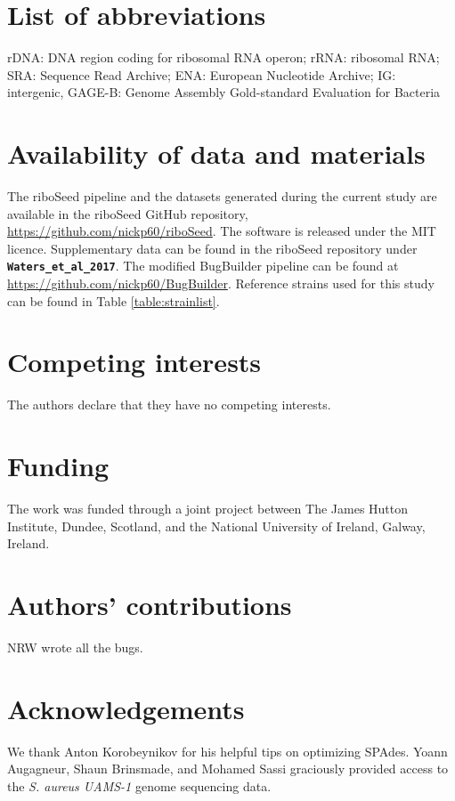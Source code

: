 \documentclass[10pt]{article}
\begin{document}
\section*{List of abbreviations}
rDNA: DNA region coding for ribosomal RNA operon; rRNA: ribosomal RNA; SRA: Sequence Read Archive; ENA: European Nucleotide Archive; IG: intergenic, GAGE-B: Genome Assembly Gold-standard Evaluation for Bacteria


\section*{Availability of data and materials}
The riboSeed pipeline and the datasets generated during the current study are available in the riboSeed GitHub repository, \url{https://github.com/nickp60/riboSeed}. The software is released under the MIT licence. Supplementary data can be found in the riboSeed repository under \textbf{\texttt{Waters\_et\_al\_2017}}. The modified BugBuilder pipeline can be found at \url{https://github.com/nickp60/BugBuilder}. Reference strains used for this study can be found in Table \ref{table:strainlist}.

\section*{Competing interests}
The authors declare that they have no competing interests.

\section*{Funding}
The work was funded through a joint project between The James Hutton Institute, Dundee, Scotland, and the National University of Ireland, Galway, Ireland.

\section*{Authors' contributions}
NRW wrote all the bugs.

\section*{Acknowledgements}
We thank Anton Korobeynikov for his helpful tips on optimizing SPAdes. Yoann Augagneur, Shaun Brinsmade, and Mohamed Sassi graciously provided access to the \textit{S. aureus UAMS-1} genome sequencing data.




\pagebreak

\pagebreak
\end{document}
